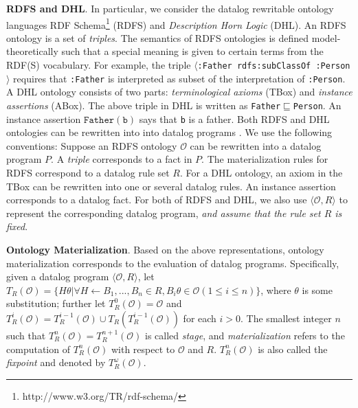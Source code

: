 \documentclass{article}
\begin{document}
\textbf{RDFS and DHL}. In particular, we consider the datalog rewritable ontology languages RDF Schema\footnote{http://www.w3.org/TR/rdf-schema/} (RDFS) and \emph{Description Horn Logic} (DHL). %
An RDFS ontology is a set of \emph{triples}. 
The semantics of RDFS ontologies is defined model-theoretically such that a special meaning is given to certain terms from the RDF(S) vocabulary. For example, the triple $\langle$\texttt{:Father rdfs:subClassOf :Person}$\rangle$ requires that \texttt{:Father} is interpreted as subset of the interpretation of \texttt{:Person}. 
A DHL ontology consists of two parts: \emph{terminological axioms} (TBox) and \emph{instance assertions} (ABox). The above triple in DHL is written as \texttt{Father$\sqsubseteq$Person}. An instance assertion $\texttt{Father}(\texttt{b})$ says that \texttt{b} is a father. Both RDFS and DHL ontologies can be rewritten into  into datalog programs \cite{DBLP:conf/www/GrosofHVD03,DBLP:conf/www/HorrocksP04}.
We use the following conventions: Suppose an RDFS ontology $\mathcal{O}$
can be rewritten into a datalog program $P$. A \emph{triple} corresponds to a fact in $P$. The materialization rules for RDFS correspond to a datalog rule set $R$. For a DHL ontology, an axiom in the TBox can be rewritten into one or several datalog rules. An instance assertion corresponds to a datalog fact.
For both of RDFS and DHL, we also use $\langle\mathcal{O}, R\rangle$ to represent the corresponding datalog program, \emph{and assume that the rule set $R$ is fixed}.

\textbf{Ontology Materialization}. Based on the above representations, ontology materialization corresponds to the evaluation of datalog programs. Specifically, given a datalog program $\langle\mathcal{O}, R\rangle$, let $T_R(\mathcal{O})=\{H\theta|\forall H\leftarrow B_1,...,B_n\in R, B_i\theta\in\mathcal{O} (1\leq i\leq n)\}$, where $\theta$ is some substitution; further let $T_R^{0}(\mathcal{O})=\mathcal{O}$ and $T_R^{i}(\mathcal{O})=T_R^{i-1}(\mathcal{O})\cup T_R(T_R^{i-1}(\mathcal{O}))$ for each $i>0$. The
smallest integer $n$ such that $T_R^{n}(\mathcal{O})= T_R^{n+1}(\mathcal{O})$ is called \emph{stage}, and \emph{materialization} refers to the computation of $T_R^{n}(\mathcal{O})$ with respect to $\mathcal{O}$ and $R$. $T_R^{n}(\mathcal{O})$ is also called the \emph{fixpoint} and denoted by $T_R^{\omega}(\mathcal{O})$.
\end{document}
